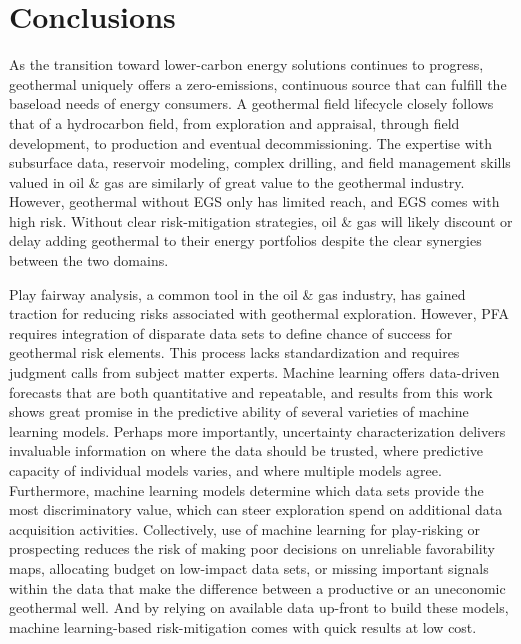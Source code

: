 \chapter{Conclusions}\label{ch8:conclusions}
As the transition toward lower-carbon energy solutions continues to progress, geothermal uniquely offers a zero-emissions, continuous source that can fulfill the baseload needs of energy consumers. A geothermal field lifecycle closely follows that of a hydrocarbon field, from exploration and appraisal, through field development, to production and eventual decommissioning. The expertise with subsurface data, reservoir modeling, complex drilling, and field management skills valued in oil \& gas are similarly of great value to the geothermal industry. However, geothermal without EGS only has limited reach, and EGS comes with high risk. Without clear risk-mitigation strategies, oil \& gas will likely discount or delay adding geothermal to their energy portfolios despite the clear synergies between the two domains.

Play fairway analysis, a common tool in the oil \& gas industry, has gained traction for reducing risks associated with geothermal exploration. However, PFA requires integration of disparate data sets to define chance of success for geothermal risk elements. This process lacks standardization and requires judgment calls from subject matter experts. Machine learning offers data-driven forecasts that are both quantitative and repeatable, and results from this work shows great promise in the predictive ability of several varieties of machine learning models. Perhaps more importantly, uncertainty characterization delivers invaluable information on where the data should be trusted, where predictive capacity of individual models varies, and where multiple models agree. Furthermore, machine learning models determine which data sets provide the most discriminatory value, which can steer exploration spend on additional data acquisition activities. Collectively, use of machine learning for play-risking or prospecting reduces the risk of making poor decisions on unreliable favorability maps, allocating budget on low-impact data sets, or missing important signals within the data that make the difference between a productive or an uneconomic geothermal well. And by relying on available data up-front to build these models, machine learning-based risk-mitigation comes with quick results at low cost.

